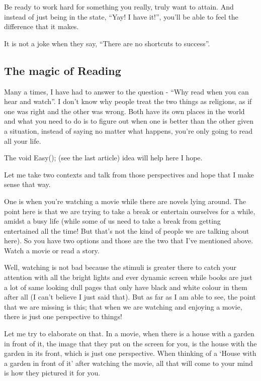 \documentclass[twoside,11pt,titlepage]{article}
\begin{document}
Be ready to work hard for something you really, truly want to attain. And instead of just being in the state, ``Yay! I have it!'', you'll be able to feel the difference that it makes.

It is not a joke when they say, ``There are no shortcuts to success''.

\newpage
\begin{center}
  \section{The magic of Reading}
\end{center}
\bigskip
\bigskip
\bigskip

Many a times, I have had to answer to the question - ``Why read when you can hear and watch''. I don't know why people treat the two things as religions, as if one was right and the other was wrong. Both have its own places in the world and what you need to do is to figure out when one is better than the other given a situation, instead of saying no matter what happens, you're only going to read all your life.

The void Easy(); (see the last article) idea will help here I hope.

Let me take two contexts and talk from those perspectives and hope that I make sense that way.

One is when you're watching a movie while there are novels lying around. The point here is that we are trying to take a break or entertain ourselves for a while, amidst a busy life (while some of us need to take a break from getting entertained all the time! But that's not the kind of people we are talking about here). So you have two options and those are the two that I've mentioned above. Watch a movie or read a story.

Well, watching is not bad because the stimuli is greater there to catch your attention with all the bright lights and ever dynamic screen while books are just a lot of same looking dull pages that only have black and white colour in them after all (I can't believe I just said that). But as far as I am able to see, the point that we are missing is this; that when we are watching and enjoying a movie, there is just one perspective to things!

Let me try to elaborate on that. In a movie, when there is a house with a garden in front of it, the image that they put on the screen for you, is the house with the garden in its front, which is just one perspective. When thinking of a `House with a garden in front of it' after watching the movie, all that will come to your mind is how they pictured it for you.
\end{document}
